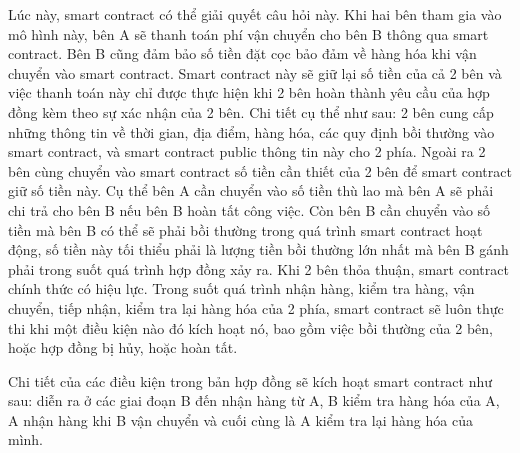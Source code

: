 Lúc này, smart contract có thể giải quyết câu hỏi này. Khi hai bên tham gia vào mô hình này, bên A sẽ thanh toán phí vận chuyển cho bên B thông qua smart contract. Bên B cũng đảm bảo số tiền đặt cọc bảo đảm về hàng hóa khi vận chuyển vào smart contract. Smart contract này sẽ giữ lại số tiền của cả 2 bên và việc thanh toán này chỉ được thực hiện khi 2 bên hoàn thành yêu cầu của hợp đồng kèm theo sự xác nhận của 2 bên. Chi tiết cụ thể như sau: 2 bên cung cấp những thông tin về thời gian, địa điểm, hàng hóa, các quy định bồi thường vào smart contract, và smart contract public thông tin này cho 2 phía. Ngoài ra 2 bên cùng chuyển vào smart contract số tiền cần thiết của 2 bên để smart contract giữ số tiền này. Cụ thể bên A cần chuyển vào số tiền thù lao mà bên A sẽ phải chi trả cho bên B nếu bên B hoàn tất công việc. Còn bên B cần chuyển vào số tiền mà bên B có thể sẽ phải bồi thường trong quá trình smart contract hoạt động, số tiền này tối thiểu phải là lượng tiền bồi thường lớn nhất mà bên B gánh phải trong suốt quá trình hợp đồng xảy ra. Khi 2 bên thỏa thuận, smart contract chính thức có hiệu lực. Trong suốt quá trình nhận hàng, kiểm tra hàng, vận chuyển, tiếp nhận, kiểm tra lại hàng hóa của 2 phía, smart contract sẽ luôn thực thi khi một điều kiện nào đó kích hoạt nó, bao gồm việc bồi thường của 2 bên, hoặc hợp đồng bị hủy, hoặc hoàn tất.


Chi tiết của các điều kiện trong bản hợp đồng sẽ kích hoạt smart contract như sau: diễn ra ở các giai đoạn B đến nhận hàng từ A, B kiểm tra hàng hóa của A, A nhận hàng khi B vận chuyển và cuối cùng là A kiểm tra lại hàng hóa của mình.

